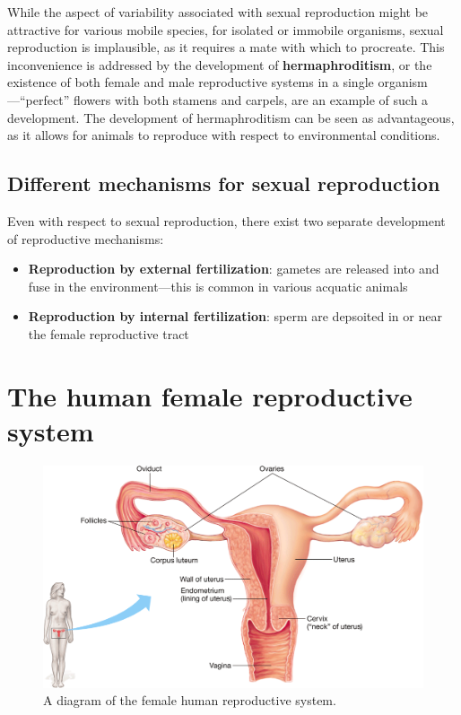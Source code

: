 \documentclass{article}
\begin{document}
While the aspect of variability associated with sexual reproduction might be
attractive for various mobile species, for isolated or immobile organisms,
sexual reproduction is implausible, as it requires a mate with which to
procreate. This inconvenience is addressed by the development of
\textbf{hermaphroditism}, or the existence of both female and male
reproductive systems in a single organism---``perfect'' flowers with both
stamens and carpels, are an example of such a development. The development
of hermaphroditism can be seen as advantageous, as it allows for animals to
reproduce with respect to environmental conditions.

\subsection{Different mechanisms for sexual reproduction}

Even with respect to sexual reproduction, there exist two separate development
of reproductive mechanisms:

\begin{itemize}
	\item \textbf{Reproduction by external fertilization}: gametes are released
		into and fuse in the environment---this is common in various acquatic animals
	\item \textbf{Reproduction by internal fertilization}: sperm are depsoited
		in or near the female reproductive tract
\end{itemize}

\section{The human female reproductive system}

\begin{figure}
	\centering
	\includegraphics[width=0.9\linewidth]{female_reproductive_system.png}
	\caption{A diagram of the female human reproductive system.}
\end{figure}
\end{document}
